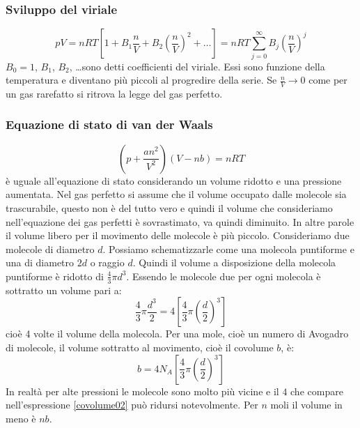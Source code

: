 \subsubsection{Sviluppo del viriale}
\begin{equation}
pV=nRT\left[1+B_1\frac{n}{V}+B_2\left(\frac{n}{V}\right)^2+\ldots\right]=nRT\sum_{j=0}^\infty B_j\left(\frac{n}{V}\right)^j
\end{equation}
$B_0=1$, $B_1$, $B_2$, \ldots sono detti coefficienti del viriale. Essi sono funzione della temperatura e diventano più piccoli al progredire della serie. Se $\frac{n}{V}\to 0$ come per un gas rarefatto si ritrova la legge del gas perfetto.
\subsubsection{Equazione di stato di van der Waals}
\begin{equation}
\left(p+\frac{an^2}{V^2}\right)(V-nb)=nRT
\end{equation}
è uguale all'equazione di stato considerando un volume ridotto e una pressione aumentata. Nel gas perfetto si assume che il volume occupato dalle molecole sia trascurabile, questo non è del tutto vero e quindi il volume che consideriamo nell'equazione dei gas perfetti è sovrastimato, va quindi diminuito. In altre parole il volume libero per il movimento delle molecole è più piccolo. Consideriamo due molecole di diametro $d$. Possiamo schematizzarle come una molecola puntiforme e una di diametro $2d$ o raggio $d$. Quindi il volume a disposizione della molecola puntiforme è ridotto di $\frac{4}{3}\pi d^3$. Essendo le molecole due per ogni molecola è sottratto un volume pari a:
\begin{equation}
\frac{4}{3}\pi\frac{d^3}{2}=4\left[\frac{4}{3}\pi\left(\frac{d}{2}\right)^3\right]
\end{equation}
cioè 4 volte il volume della molecola. Per una mole, cioè un numero di Avogadro di molecole, il volume sottratto al movimento, cioè il covolume $b$, è:
\begin{equation}
b=4N_A\left[\frac{4}{3}\pi\left(\frac{d}{2}\right)^3\right]
\label{covolume02}
\end{equation}
In realtà per alte pressioni le molecole sono molto più vicine e il $4$ che compare nell'espressione \eqref{covolume02} può ridursi notevolmente. Per $n$ moli il volume in meno è $nb$.

